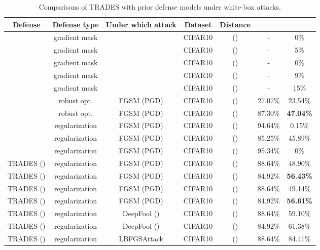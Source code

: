 \documentclass[11pt]{article}
\newcommand{\0}{\mathbf{0}}
\newcommand{\1}{\mathbf{1}}
\begin{document}
\begin{table*}
	\caption{Comparisons of TRADES with prior defense models under white-box attacks.}
	\label{table: icml best paper defense}
	\centering
\begin{tabular}{c||c|c|c|c|c|c}\hline
		Defense & Defense type & Under which attack & Dataset & Distance &    &   
		\\
		\hline
		\hline
		\cite{buckman2018thermometer} & gradient mask & \cite{athalye2018obfuscated} & CIFAR10 &  () & - & 0\% \\
		\cite{ma2018characterizing} & gradient mask & \cite{athalye2018obfuscated} & CIFAR10 &   () & - & 5\% \\
		\cite{dhillon2018stochastic} & gradient mask & \cite{athalye2018obfuscated} & CIFAR10 &   () & - & 0\% \\
		\cite{song2018pixeldefend} & gradient mask & \cite{athalye2018obfuscated} & CIFAR10 &  () & - & 9\% \\ 
		\cite{na2017cascade} & gradient mask & \cite{athalye2018obfuscated} & CIFAR10 &  () & - & 15\% \\ 
		\cite{wong1805scaling} & robust opt. & FGSM (PGD) & CIFAR10 &  () & 27.07\% & 23.54\% \\
		\cite{madry2018towards} & robust opt. & FGSM (PGD) & CIFAR10 &  () & 87.30\% & \textbf{47.04\%} \\
		\cite{zheng2016improving} & regularization & FGSM (PGD) & CIFAR10 &  () & 94.64\% & 0.15\% \\
		\cite{kurakin2016adversarial} & regularization & FGSM (PGD) & CIFAR10 &  () & 85.25\% & 45.89\% \\
		\cite{ross2017improving} & regularization & FGSM (PGD) & CIFAR10 &  () & 95.34\% & 0\% \\
		{TRADES} () & regularization & FGSM (PGD)  & CIFAR10 &   () & 88.64\% & 48.90\% \\
		{TRADES} () & regularization & FGSM (PGD) & CIFAR10 &   () & 84.92\% & \textbf{56.43\%} \\
		{TRADES} () & regularization & FGSM (PGD)  & CIFAR10 &   () & 88.64\% & 49.14\% \\
		{TRADES} () & regularization & FGSM (PGD) & CIFAR10 &   () & 84.92\% & \textbf{56.61\%} \\
{TRADES} () & regularization & DeepFool () & CIFAR10 &   () & 88.64\% & 59.10\% \\
{TRADES} () & regularization & DeepFool () & CIFAR10 &   () & 84.92\% & 61.38\% \\
		{TRADES} () & regularization & LBFGSAttack  & CIFAR10 &   () & 88.64\% & 84.41\% \\

\end{tabular}
\end{table*}
\end{document}
